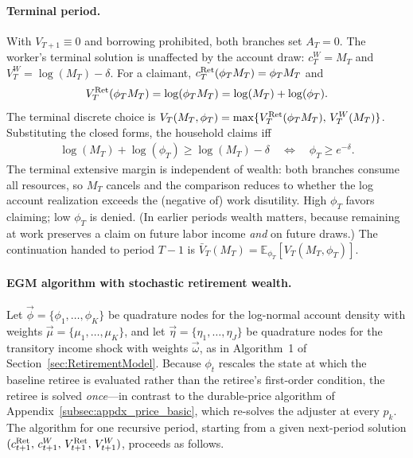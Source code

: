 \paragraph{Terminal period.}
With $V_{T+1}\equiv 0$ and borrowing prohibited, both branches set $A_T=0$. The worker's terminal solution is unaffected by the account draw: $c_T^{W}=M_T$ and $V_T^{W}=\log(M_T)-\delta$. For a claimant, $c_T^{\mathrm{Ret}}(\phi_T M_T)=\phi_T M_T$ and
\begin{align}
	V_T^{\mathrm{Ret}}(\phi_T M_T) = \log(\phi_T M_T) = \log(M_T)+\log(\phi_T).
	\label{eq:ret_price_terminal}
\end{align}
The terminal discrete choice is $V_T(M_T,\phi_T)=\max\{V_T^{\mathrm{Ret}}(\phi_T M_T),\,V_T^{W}(M_T)\}$. Substituting the closed forms, the household claims iff
\begin{align}
	\log(M_T)+\log(\phi_T)
	\ge \log(M_T)-\delta
	\quad\Longleftrightarrow\quad
	\phi_T \ge e^{-\delta}.
	\label{eq:ret_price_terminal_threshold}
\end{align}
The terminal extensive margin is independent of wealth: both branches consume all resources, so $M_T$ cancels and the comparison reduces to whether the log account realization exceeds the (negative of) work disutility. High $\phi_T$ favors claiming; low $\phi_T$ is denied. (In earlier periods wealth matters, because remaining at work preserves a claim on future labor income \emph{and} on future draws.) The continuation handed to period $T-1$ is $\bar V_T(M_T)=\mathbb{E}_{\phi_T}[V_T(M_T,\phi_T)]$.

\paragraph{EGM algorithm with stochastic retirement wealth.}
Let $\vec\phi=\{\phi_1,\dots,\phi_K\}$ be quadrature nodes for the log-normal account density with weights $\vec\mu=\{\mu_1,\dots,\mu_K\}$, and let $\vec\eta=\{\eta_1,\dots,\eta_J\}$ be quadrature nodes for the transitory income shock with weights $\vec\omega$, as in Algorithm~1 of Section~\ref{sec:RetirementModel}. Because $\phi_t$ rescales the state at which the baseline retiree is evaluated rather than the retiree's first-order condition, the retiree is solved \emph{once}---in contrast to the durable-price algorithm of Appendix~\ref{subsec:appdx_price_basic}, which re-solves the adjuster at every $p_k$. The algorithm for one recursive period, starting from a given next-period solution $(c_{t+1}^{\mathrm{Ret}},\,c_{t+1}^{W},\,V_{t+1}^{\mathrm{Ret}},\,V_{t+1}^{W})$, proceeds as follows.

